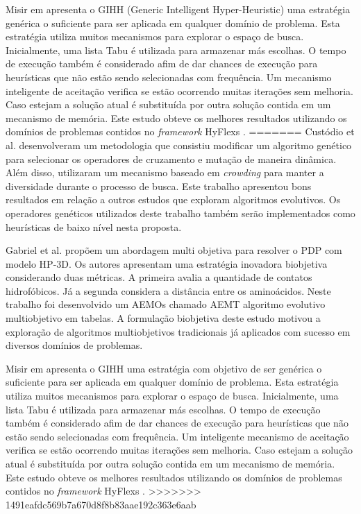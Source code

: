 Misir em \cite{misir2012intelligent} apresenta o GIHH (Generic Intelligent Hyper-Heuristic) uma estratégia genérica o suficiente para ser aplicada em qualquer domínio de problema. Esta estratégia utiliza muitos mecanismos para explorar o espaço de busca. Inicialmente, uma lista Tabu é utilizada para armazenar más escolhas. O tempo de execução também é considerado afim de dar chances de execução para heurísticas que não estão sendo selecionadas com frequência. Um mecanismo inteligente de aceitação verifica se estão ocorrendo muitas iterações sem melhoria. Caso estejam a solução atual é substituída por outra solução contida em um mecanismo de memória. Este estudo obteve os melhores resultados utilizando os domínios de problemas contidos no \textit{framework} HyFlexs \cite{ochoa2012hyflex}.
=======
Custódio et al. \cite{custodio2014multiple} desenvolveram um metodologia que consistiu modificar um algoritmo genético para selecionar os operadores de cruzamento e mutação de maneira dinâmica. Além disso, utilizaram um mecanismo baseado em \textit{crowding}  para manter a diversidade durante o processo de busca. Este trabalho apresentou bons resultados em relação a outros estudos que exploram algoritmos evolutivos. Os operadores genéticos utilizados deste trabalho também serão implementados como heurísticas de baixo nível nesta proposta.

Gabriel et al. propõem um abordagem multi objetiva \cite{gabriel2012algoritmos} para resolver o PDP com modelo HP-3D. Os autores apresentam uma estratégia inovadora biobjetiva considerando duas métricas. A primeira avalia a quantidade de contatos hidrofóbicos. Já a segunda considera a distância entre os aminoácidos. Neste trabalho foi desenvolvido um AEMOs chamado AEMT \cite{gabriel2012algoritmos} algoritmo evolutivo multiobjetivo em tabelas. A formulação biobjetiva deste estudo motivou a exploração de algoritmos multiobjetivos tradicionais já aplicados com sucesso em diversos domínios de problemas.  


Misir em \cite{misir2012intelligent} apresenta o GIHH uma estratégia com objetivo de ser genérica o suficiente para ser aplicada em qualquer domínio de problema. Esta estratégia utiliza muitos mecanismos para explorar o espaço de busca. Inicialmente, uma lista Tabu é utilizada para armazenar más escolhas. O tempo de execução também é considerado afim de dar chances de execução para heurísticas que não estão sendo selecionadas com frequência. Um inteligente mecanismo de aceitação verifica se estão ocorrendo muitas iterações sem melhoria. Caso estejam a solução atual é substituída por outra solução contida em um mecanismo de memória. Este estudo obteve os melhores resultados utilizando os domínios de problemas contidos no \textit{framework} HyFlexs \cite{ochoa2012hyflex}.
>>>>>>> 1491eafdc569b7a670d8f8b83aae192c363e6aab

